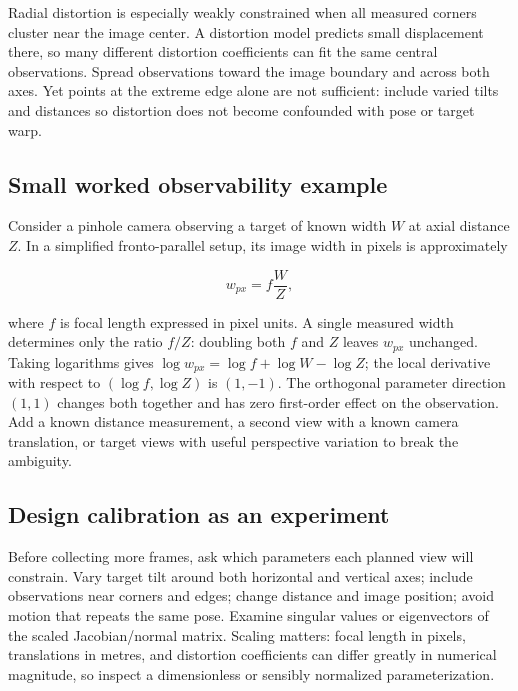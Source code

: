 Radial distortion is especially weakly constrained when all measured corners cluster near the image center. A distortion model predicts small displacement there, so many different distortion coefficients can fit the same central observations. Spread observations toward the image boundary and across both axes. Yet points at the extreme edge alone are not sufficient: include varied tilts and distances so distortion does not become confounded with pose or target warp.

\subsection{Small worked observability example}\label{02-foundations-ii-ch036-small-worked-observability-example}

Consider a pinhole camera observing a target of known width \(W\) at axial distance \(Z\). In a simplified fronto-parallel setup, its image width in pixels is approximately

\[
w_{px}=f\frac{W}{Z},
\]

where \(f\) is focal length expressed in pixel units. A single measured width determines only the ratio \(f/Z\): doubling both \(f\) and \(Z\) leaves \(w_{px}\) unchanged. Taking logarithms gives \(\log w_{px}=\log f+\log W-\log Z\); the local derivative with respect to \((\log f,\log Z)\) is \((1,-1)\). The orthogonal parameter direction \((1,1)\) changes both together and has zero first-order effect on the observation. Add a known distance measurement, a second view with a known camera translation, or target views with useful perspective variation to break the ambiguity.

\subsection{Design calibration as an experiment}\label{02-foundations-ii-ch036-design-calibration-as-an-experiment}

Before collecting more frames, ask which parameters each planned view will constrain. Vary target tilt around both horizontal and vertical axes; include observations near corners and edges; change distance and image position; avoid motion that repeats the same pose. Examine singular values or eigenvectors of the scaled Jacobian/normal matrix. Scaling matters: focal length in pixels, translations in metres, and distortion coefficients can differ greatly in numerical magnitude, so inspect a dimensionless or sensibly normalized parameterization.

